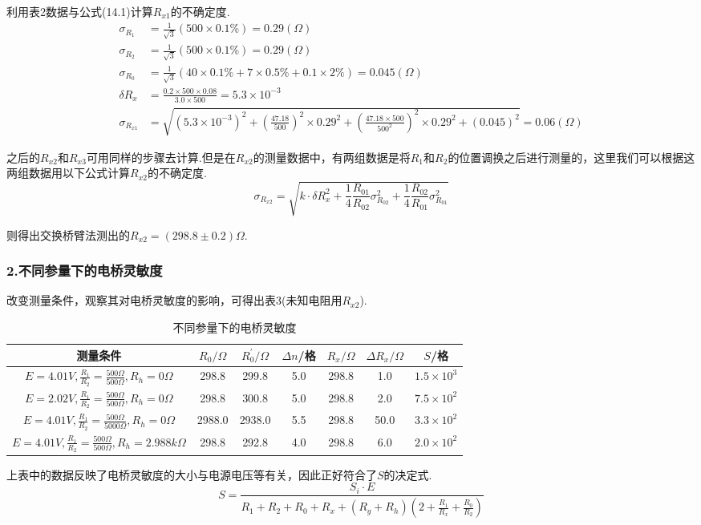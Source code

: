 \documentclass[12pt,a4paper,UTF8]{ctexart}
\begin{document}
\par
利用表2数据与公式(14.1)计算$R_{x1}$的不确定度.
\begin{align*}
\sigma_{R_1}&=\frac{1}{\sqrt{3}}(500\times0.1\%)=0.29(\Omega) \\
\sigma_{R_2}&=\frac{1}{\sqrt{3}}(500\times0.1\%)=0.29(\Omega) \\
\sigma_{R_0}&=\frac{1}{\sqrt{3}}(40\times0.1\%+7\times0.5\%+0.1\times2\%)=0.045(\Omega) \\
\delta R_x&=\frac{0.2\times500\times0.08}{3.0\times500}=5.3\times10^{-3} \\
\sigma_{R_{x1}}&=\sqrt{(5.3\times10^{-3})^2+(\frac{47.18}{500})^2\times0.29^2+(\frac{47.18\times500}{500^2})^2\times0.29^2+(0.045)^2}=0.06(\Omega)
\end{align*}
\par
之后的$R_{x2}$和$R_{x3}$可用同样的步骤去计算.但是在$R_{x2}$的测量数据中，有两组数据是将$R_1$和$R_2$的位置调换之后进行测量的，这里我们可以根据这两组数据用以下公式计算$R_{x2}$的不确定度.
\begin{equation}
\sigma_{R_{x2}}=\sqrt{k\cdot\delta R_x^2+\frac{1}{4}\frac{R_{01}}{R_{02}}\sigma_{R_{02}}^2+\frac{1}{4}\frac{R_{02}}{R_{01}}\sigma_{R_{01}}^2} \tag{14.2}
\end{equation}
\par
则得出交换桥臂法测出的$R_{x2}=(298.8\pm0.2)\Omega$.
\subsubsection*{2.不同参量下的电桥灵敏度}
改变测量条件，观察其对电桥灵敏度的影响，可得出表3(未知电阻用$R_{x2}$).
\begin{table}[htbp]
\centering
\caption{不同参量下的电桥灵敏度}
\begin{tabular}{|c|c|c|c|c|c|c|}
\hline
测量条件&$R_0/\Omega$&$R_0^{\prime}/\Omega$&$\Delta n$/格&$R_x/\Omega$&$\Delta R_x/\Omega$&$S$/格 \\
\hline
$E=4.01V,\frac{R_1}{R_2}=\frac{500\Omega}{500\Omega},R_h=0\Omega$&298.8&299.8&5.0&298.8&1.0&$1.5\times10^{3}$ \\
\hline
$E=2.02V,\frac{R_1}{R_2}=\frac{500\Omega}{500\Omega},R_h=0\Omega$&298.8&300.8&5.0&298.8&2.0&$7.5\times10^2$ \\
\hline
$E=4.01V,\frac{R_1}{R_2}=\frac{500\Omega}{5000\Omega},R_h=0\Omega$&2988.0&2938.0&5.5&298.8&50.0&$3.3\times10^2$ \\
\hline
$E=4.01V,\frac{R_1}{R_2}=\frac{500\Omega}{500\Omega},R_h=2.988k\Omega$&298.8&292.8&4.0&298.8&6.0&$2.0\times10^2$\\
\hline
\end{tabular}
\end{table}
\par
上表中的数据反映了电桥灵敏度的大小与电源电压等有关，因此正好符合了$S$的决定式.
\begin{equation}
S=\frac{S_i\cdot E}{R_1+R_2+R_0+R_x+(R_g+R_h)(2+\frac{R_1}{R_x}+\frac{R_0}{R_2})} \tag{14.3}
\end{equation}
\end{document}

